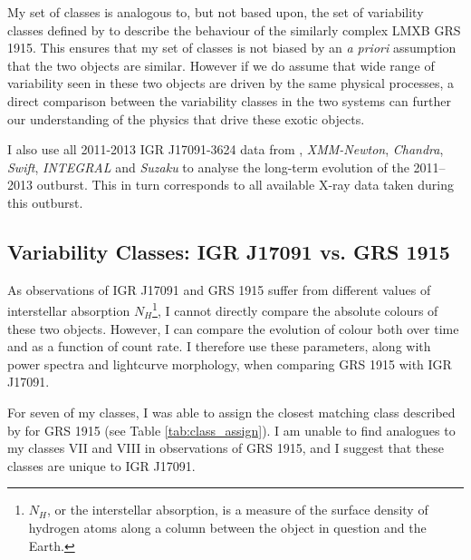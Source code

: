 \par My set of classes is analogous to, but not based upon, the set of variability classes defined by \citealt{Belloni_GRS_MI} to describe the behaviour of the similarly complex LMXB GRS 1915.  This ensures that my set of classes is not biased by an \textit{a priori} assumption that the two objects are similar.  However if we do assume that wide range of variability seen in these two objects are driven by the same physical processes, a direct comparison between the variability classes in the two systems can further our understanding of the physics that drive these exotic objects.
\par I also use all 2011-2013 IGR J17091-3624 data from \rxte , \textit{XMM-Newton}, \textit{Chandra}, \textit{Swift}, \textit{INTEGRAL} and \textit{Suzaku} to analyse the long-term evolution of the 2011--2013 outburst.  This in turn corresponds to all available X-ray data taken during this outburst.

\subsection{Variability Classes: IGR J17091 vs. GRS 1915}

\label{sec:IGRcomp}

\par As observations of IGR J17091 and GRS 1915 suffer from different values of interstellar absorption $N_H$\footnote{$N_H$, or the interstellar absorption, is a measure of the surface density of hydrogen atoms along a column between the object in question and the Earth.}, I cannot directly compare the absolute colours of these two objects.  However, I can compare the evolution of colour both over time and as a function of count rate.  I therefore use these parameters, along with power spectra and lightcurve morphology, when comparing GRS 1915 with IGR J17091.
\par For seven of my classes, I was able to assign the closest matching class described by \citealt{Belloni_GRS_MI} for GRS 1915 (see Table \ref{tab:class_assign}).  I am unable to find analogues to my classes VII and VIII in observations of GRS 1915, and I suggest that these classes are unique to IGR J17091.


